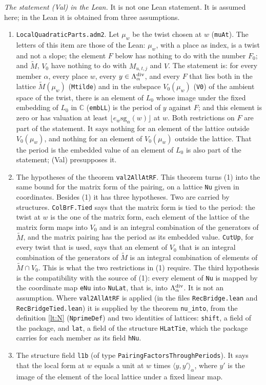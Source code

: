 \documentclass[11pt,letterpaper]{article}
\begin{document}
\emph{The statement \textup{(Val)} in the Lean.} It is not one Lean statement. It is assumed here; in
the Lean it is obtained from three assumptions.
\begin{enumerate}[label=\textup{(\arabic*)},leftmargin=2.4em,itemsep=1pt,topsep=2pt]
\item \texttt{LocalQuadraticParts.adm2}. Let $\mu_w$ be the twist chosen at $w$ (\texttt{muAt}). The
letters of this item are those of the Lean: $\mu_w$, with a place as index, is a twist and not a slope; the
element $F$ below has nothing to do with the number $F_0$; and $\widetilde M$, $V_0$ have nothing to do
with $M_{u,t,j}$ and $V$. The statement is: for every member $\alpha$, every place $w$, every $y\in\Lambda^{\rm div}_\alpha$, and every
$F$ that lies both in the lattice $\widetilde M(\mu_w)$ (\texttt{Mtilde}) and in the subspace
$V_0(\mu_w)$ (\texttt{V0}) of the ambient space of the twist, there is an element of $L_0$ whose image
under the fixed embedding of $L_0$ in $\mathbb C$ (\texttt{embLL}) is the period of $y$ against $F$; and
this element is zero or has valuation at least $\lfloor e_w\mathrm{sg}_\alpha(w)\rfloor$ at $w$. Both
restrictions on $F$ are part of the statement. It says nothing for an element of the lattice outside
$V_0(\mu_w)$, and nothing for an element of $V_0(\mu_w)$ outside the lattice. That the period is the
embedded value of an element of $L_0$ is also part of the statement; \textup{(Val)} presupposes it.
\item The hypotheses of the theorem \texttt{val2AllAtRF}. This theorem turns \textup{(1)} into the same
bound for the matrix form of the pairing, on a lattice \texttt{Nu} given in coordinates. Besides
\textup{(1)} it has three hypotheses. Two are carried by structures. \texttt{ColBrF.Tied} says that the
matrix form is tied to the period: the twist at $w$ is the one of the matrix form, each element of the
lattice of the matrix form maps into $V_0$ and is an integral combination of the generators of
$\widetilde M$, and the matrix pairing has the period as its embedded value. \texttt{CutUp}, for every twist
that is used, says that an element of $V_0$ that is an integral combination of the generators of
$\widetilde M$ is an integral combination of elements of $\widetilde M\cap V_0$. This is what the two
restrictions in \textup{(1)} require. The third hypothesis is the compatibility with the source of
\textup{(1)}: every element of \texttt{Nu} is mapped by the coordinate map \texttt{eNu} into
\texttt{NuLat}, that is, into $\Lambda^{\rm div}_\alpha$. It is not an assumption. Where
\texttt{val2AllAtRF} is applied (in the files \texttt{RecBridge.lean} and \texttt{RecBridgeTied.lean}) it
is supplied by the theorem \texttt{nu\_into}, from the definition \eqref{lt:N} (\texttt{NprimeDef}) and two
identities of lattices: \texttt{shift}, a field of the package, and \texttt{lat}, a field of the structure
\texttt{HLatTie}, which the package carries for each member as its field \texttt{hNu}.
\item The structure field \texttt{l1b} (of type \texttt{PairingFactorsThroughPeriods}). It says that the
local form at $w$ equals a unit at $w$ times $\langle y,y'\rangle_\alpha$, where $y'$ is the image of the
element of the local lattice under a fixed linear map.
\end{enumerate}
\end{document}
